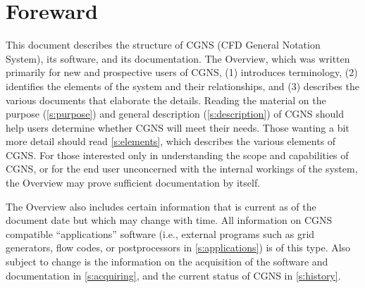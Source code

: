 \hypertarget{foreward}{}
\section*{Foreward}
\thispagestyle{plain}

This document describes the structure of CGNS (CFD General Notation
System), its software, and its documentation.
The Overview, which was written primarily for new and prospective users
of CGNS, (1) introduces terminology, (2) identifies the elements of the
system and their relationships, and (3) describes the various documents
that elaborate the details.
Reading the material on the purpose (\autoref{s:purpose}) and general
description (\autoref{s:description}) of CGNS should help users
determine whether CGNS will meet their needs.
Those wanting a bit more detail should read \autoref{s:elements}, which
describes the various elements of CGNS.
For those interested only in understanding the scope and capabilities of
CGNS, or for the end user unconcerned with the internal workings of the
system, the Overview may prove sufficient documentation by itself.

The Overview also includes certain information that is current as of the
document date but which may change with time.
All information on CGNS compatible ``applications'' software (i.e.,
external programs such as grid generators, flow codes, or postprocessors
in \autoref{s:applications}) is of this type.
Also subject to change is the information on the acquisition of the
software and documentation in \autoref{s:acquiring}, and the current
status of CGNS in \autoref{s:history}.

